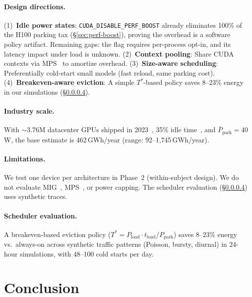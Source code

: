 \documentclass[sigconf,nonacm]{acmart}
\begin{document}
\paragraph{Design directions.} (1)~\textbf{Idle power states}: \texttt{CUDA\_DISABLE\_PERF\_BOOST} already eliminates 100\% of the H100 parking tax (\S\ref{sec:perf-boost}), proving the overhead is a software policy artifact. Remaining gaps: the flag requires per-process opt-in, and its latency impact under load is unknown. (2)~\textbf{Context pooling}: Share CUDA contexts via MPS~\cite{nvidia-mps} to amortize overhead. (3)~\textbf{Size-aware scheduling}: Preferentially cold-start small models (fast reload, same parking cost). (4)~\textbf{Breakeven-aware eviction}: A simple $T^*$-based policy saves 8--23\% energy in our simulations (\S\ref{sec:scheduler-note}).

\paragraph{Industry scale.} With $\sim$3.76M datacenter GPUs shipped in 2023~\cite{nvidia-shipments}, 35\% idle time~\cite{flexera}, and $\bar{P}_{\text{park}} = 40$\,W, the base estimate is 462\,GWh/year (range: 92--1{,}745\,GWh/year).

\paragraph{Limitations.} We test one device per architecture in Phase~2 (within-subject design). We do not evaluate MIG~\cite{nvidia-mig}, MPS~\cite{nvidia-mps}, or power capping. The scheduler evaluation (\S\ref{sec:scheduler-note}) uses synthetic traces.

\paragraph{Scheduler evaluation.}
\label{sec:scheduler-note}
A breakeven-based eviction policy ($T^* = P_{\text{load}} \cdot t_{\text{load}} / P_{\text{park}}$) saves 8--23\% energy vs.\ always-on across synthetic traffic patterns (Poisson, bursty, diurnal) in 24-hour simulations, with 48--100 cold starts per day.

\section{Conclusion}
\end{document}
